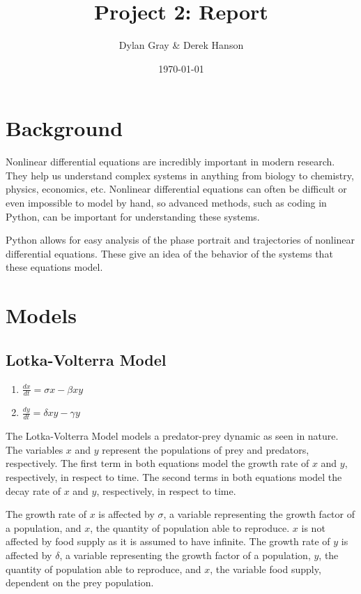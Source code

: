 \documentclass[11pt]{article}
\title{Project 2: Report}
\author{Dylan Gray \& Derek Hanson}
\date{\today}
\begin{document}
\sloppy
\maketitle

\section{Background}
Nonlinear differential equations are incredibly important in modern research.  They help us understand complex systems in anything from biology to chemistry, physics, economics, etc.  Nonlinear differential equations can often be difficult or even impossible to model by hand, so advanced methods, such as coding in Python, can be important for understanding these systems. \newline

\noindent Python allows for easy analysis of the phase portrait and trajectories of nonlinear differential equations.  These give an idea of the behavior of the systems that these equations model. 

\section{Models}

\subsection{Lotka-Volterra Model \cite{listofnonlinearODEs}} 
\begin{enumerate}
    \item $\frac{dx}{dt}=\sigma x - \beta xy$
    \item $\frac{dy}{dt}=\delta xy - \gamma y$
\end{enumerate}
The Lotka-Volterra Model models a predator-prey dynamic as seen in nature.  The variables $x$ and $y$ represent the populations of prey and predators, respectively.  The first term in both equations model the growth rate of $x$ and $y$, respectively, in respect to time.  The second terms in both equations model the decay rate of $x$ and $y$, respectively, in respect to time.\newline

\noindent The growth rate of $x$ is affected by $\sigma$, a variable representing the growth factor of a population, and $x$, the quantity of population able to reproduce.  $x$ is not affected by food supply as it is assumed to have infinite.  The growth rate of $y$ is affected by $\delta$, a variable representing the growth factor of a population, $y$, the quantity of population able to reproduce, and $x$, the variable food supply, dependent on the prey population.\newline
\end{document}
